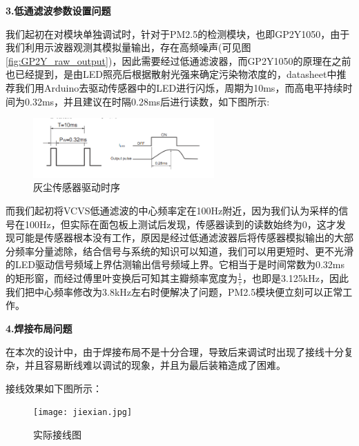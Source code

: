 \documentclass[a4paper, 11pt]{article} %
\begin{document}
\par{} \textbf{3.低通滤波参数设置问题}

\par{} 我们起初在对模块单独调试时，针对于PM2.5的检测模块，也即GP2Y1050，由于我们利用示波器观测其模拟量输出，存在高频噪声(可见图\ref{fig:GP2Y_raw_output})，因此需要经过低通滤波器，而GP2Y1050的原理在之前也已经提到，是由LED照亮后根据散射光强来确定污染物浓度的，datasheet中推荐我们用Arduino去驱动传感器中的LED进行闪烁，周期为10ms，而高电平持续时间为0.32ms，并且建议在时隔0.28ms后进行读数，如下图所示:
\begin{figure}[H]
  \centering
  \includegraphics[width = 0.618\textwidth]{GP2Y.png}
  \caption{灰尘传感器驱动时序}
  \label{imgn}
\end{figure}

\par{} 而我们起初将VCVS低通滤波的中心频率定在100Hz附近，因为我们认为采样的信号在100Hz，但实际在面包板上测试后发现，传感器读到的读数始终为0，这才发现可能是传感器根本没有工作，原因是经过低通滤波器后将传感器模拟输出的大部分频率分量滤除，结合信号与系统的知识可以知道，我们可以用更短时、更不光滑的LED驱动信号频域上界估测输出信号频域上界。它相当于是时间常数为0.32ms的矩形窗，而经过傅里叶变换后可知其主瓣频率宽度为$\frac{1}{\tau}$，也即是3.125kHz，因此我们把中心频率修改为3.8kHz左右时便解决了问题，PM2.5模块便立刻可以正常工作。

\par{} \textbf{4.焊接布局问题}
\par{} 在本次的设计中，由于焊接布局不是十分合理，导致后来调试时出现了接线十分复杂，并且容易断线难以调试的现象，并且为最后装箱造成了困难。
\par{} 接线效果如下图所示：
\begin{figure}[H]
  \centering
  \texttt{[image: jiexian.jpg]}
  \caption{实际接线图}
\end{figure}
\end{document}
